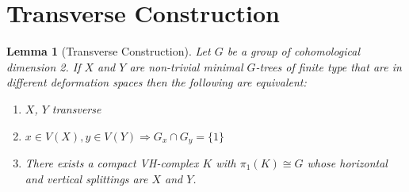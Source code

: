 \documentclass{article}
\theoremstyle{mystyle}
\newtheorem{lem}[thm]{Lemma}
\theoremstyle{remark}
\begin{document}
\section{Transverse Construction}
\begin{lem}
    [Transverse Construction]
    \label{pro:transverseconstruction} 
 Let $G$ be a group of cohomological dimension 2. If $X$ and $Y$ are non-trivial minimal $G$-trees of finite type that are in different deformation spaces then the following are equivalent:
\begin{enumerate}
    \item $X$, $Y$ transverse
    \item $x \in V(X), y\in V(Y)\Longrightarrow G_x\cap G_y = \{1\}$
    \item There exists a compact VH-complex $K$ with $\pi_1(K) \cong G$ whose horizontal and vertical splittings are $X$ and $Y$.
\end{enumerate}
\end{lem}
\end{document}
